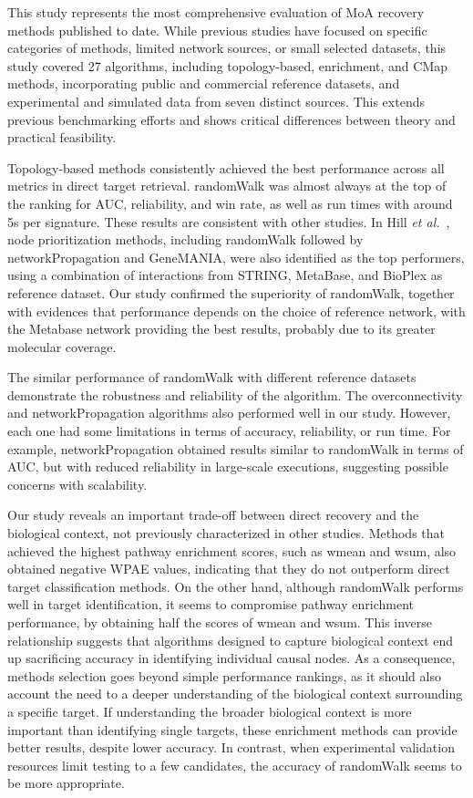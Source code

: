 This study represents the most comprehensive evaluation of \gls{MoA} recovery methods published to date. 
While previous studies have focused on specific categories of methods, limited network sources, or small selected datasets, this study covered 27 algorithms, including topology-based, enrichment, and \gls{CMap} methods, incorporating public and commercial reference datasets, and experimental and simulated data from seven distinct sources. 
This extends previous benchmarking efforts and shows critical differences between theory and practical feasibility.

Topology-based methods consistently achieved the best performance across all metrics in direct target retrieval. 
randomWalk was almost always at the top of the ranking for \gls{AUC}, reliability, and win rate, as well as run times with around 5s per signature. 
These results are consistent with other studies. 
In Hill \textit{et al.}~\cite{RN37}, node prioritization methods, including randomWalk followed by networkPropagation and GeneMANIA, were also identified as the top performers, using a combination of interactions from STRING, MetaBase, and BioPlex as reference dataset. 
Our study confirmed the superiority of randomWalk, together with evidences that performance depends on the choice of reference network, with the Metabase network providing the best results, probably due to its greater molecular coverage.

The similar performance of randomWalk with different reference datasets demonstrate the robustness and reliability of the algorithm. 
The overconnectivity and networkPropagation algorithms also performed well in our study. 
However, each one had some limitations in terms of accuracy, reliability, or run time. 
For example, networkPropagation obtained results similar to randomWalk in terms of \gls{AUC}, but with reduced reliability in large-scale executions, suggesting possible concerns with scalability.

Our study reveals an important trade-off between direct recovery and the biological context, not previously characterized in other studies. 
Methods that achieved the highest pathway enrichment scores, such as wmean and wsum, also obtained negative \gls{WPAE} values, indicating that they do not outperform direct target classification methods. 
On the other hand, although randomWalk performs well in target identification, it seems to compromise pathway enrichment performance, by obtaining half the scores of wmean and wsum. 
This inverse relationship suggests that algorithms designed to capture biological context end up sacrificing accuracy in identifying individual causal nodes. 
As a consequence, methods selection goes beyond simple performance rankings, as it should also account the need to a deeper understanding of the biological context surrounding a specific target. 
If understanding the broader biological context is more important than identifying single targets, these enrichment methods can provide better results, despite lower accuracy. 
In contrast, when experimental validation resources limit testing to a few candidates, the accuracy of randomWalk seems to be more appropriate.

